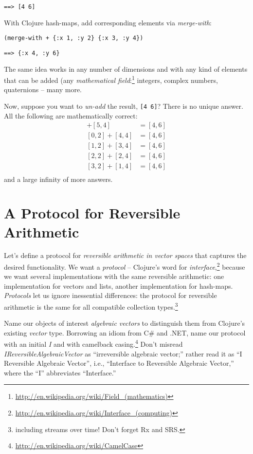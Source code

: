 \documentclass[11pt]{article}
\begin{document}
\begin{verbatim}
==> [4 6]
\end{verbatim}

With Clojure hash-maps, add corresponding elements via \emph{merge-with}:
\begin{verbatim}
(merge-with + {:x 1, :y 2} {:x 3, :y 4})
\end{verbatim}

\begin{verbatim}
==> {:x 4, :y 6}
\end{verbatim}

The same idea works in any number of dimensions and with any kind of
elements that can be added (any \emph{mathematical
field}:\footnote{\url{http://en.wikipedia.org/wiki/Field_(mathematics)}}
integers, complex numbers, quaternions -- many more.

Now, suppose you want to \emph{un-add} the result, \verb|[4 6]|? There is
no unique answer.  All the following are mathematically correct:
\begin{align*}
[-1, 2] + [5, 4] &= [4, 6] \\
[ 0, 2] + [4, 4] &= [4, 6] \\
[ 1, 2] + [3, 4] &= [4, 6] \\
[ 2, 2] + [2, 4] &= [4, 6] \\
[ 3, 2] + [1, 4] &= [4, 6] \\
\end{align*}
and a large infinity of more answers.
\section{A Protocol for Reversible Arithmetic}
\label{sec-3}

Let's define a protocol for \emph{reversible arithmetic in vector spaces}
that captures the desired functionality.  We want a \emph{protocol} --
Clojure's word for
\emph{interface},\footnote{\url{http://en.wikipedia.org/wiki/Interface_(computing)}}
because we want several implementations with the same reversible
arithmetic: one implementation for vectors and lists, another
implementation for hash-maps.  \emph{Protocols} let us ignore inessential
differences: the protocol for reversible arithmetic is the same for
all compatible collection
types.\footnote{including streams over time! Don't forget Rx and SRS.}

Name our objects of interest \emph{algebraic vectors} to distinguish them
from Clojure's existing \emph{vector} type. Borrowing an idiom from C\# and
.NET, name our protocol with an initial \emph{I} and with camelback
casing.\footnote{\url{http://en.wikipedia.org/wiki/CamelCase}} Don't misread
\emph{IReversibleAlgebraicVector} as ``irreversible algebraic vector;''
rather read it as ``I Reversible Algebraic Vector'', i.e., ``Interface
to Reversible Algebraic Vector,'' where the ``I'' abbreviates
``Interface.''
\end{document}
